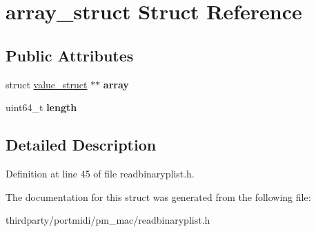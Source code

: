 \hypertarget{structarray__struct}{}\section{array\+\_\+struct Struct Reference}
\label{structarray__struct}
\subsection*{Public Attributes}
\begin{DoxyCompactItemize}
\item 
\mbox{\label{structarray__struct_ab25fc397ed68afbba0080e1cfc960832}} 
struct \hyperlink{structvalue__struct}{value\+\_\+struct} $\ast$$\ast$ {\bfseries array}
\item 
\mbox{\label{structarray__struct_a2cc7486bd91ad9da51edd7a4cbc46a35}} 
uint64\+\_\+t {\bfseries length}
\end{DoxyCompactItemize}


\subsection{Detailed Description}


Definition at line 45 of file readbinaryplist.\+h.



The documentation for this struct was generated from the following file\+:\begin{DoxyCompactItemize}
\item 
thirdparty/portmidi/pm\+\_\+mac/readbinaryplist.\+h\end{DoxyCompactItemize}
